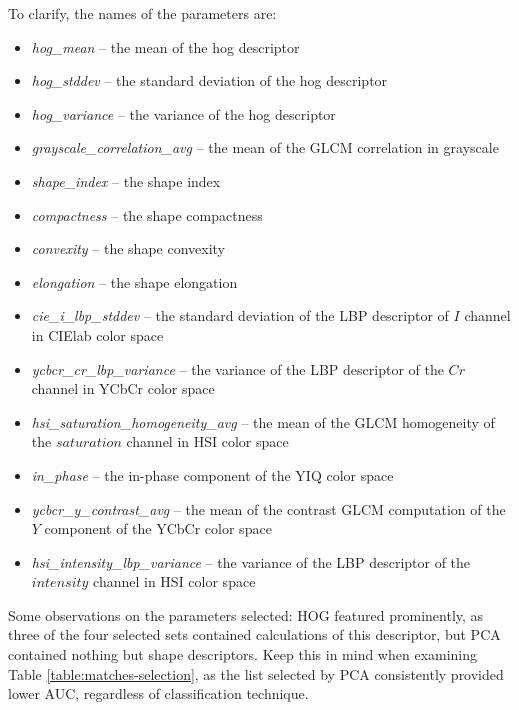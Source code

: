 \documentclass[letterpaper]{report}
\begin{document}
 To clarify, the names of the parameters are:
 \begin{itemize}
 	\item{\textit{hog\_mean} -- the mean of the hog descriptor}
 	\item{\textit{hog\_stddev} -- the standard deviation of the hog descriptor}
 	\item{\textit{hog\_variance} -- the variance of the hog descriptor}
 	\item{\textit{grayscale\_correlation\_avg} -- the mean of the GLCM correlation in grayscale}
 	\item{\textit{shape\_index} -- the shape index}
 	\item{\textit{compactness} -- the shape compactness}
 	\item{\textit{convexity} -- the shape convexity}
 	\item{\textit{elongation} -- the shape elongation}
 	\item{\textit{cie\_i\_lbp\_stddev} -- the standard deviation of the LBP descriptor of $I$ channel in CIElab color space}
 	\item{\textit{ycbcr\_cr\_lbp\_variance} -- the variance of the LBP descriptor of the $Cr$ channel in YCbCr color space}
 	\item{\textit{hsi\_saturation\_homogeneity\_avg} -- the mean of the GLCM homogeneity of the $saturation$ channel in HSI color space}
 	\item{\textit{in\_phase} -- the in-phase component of the YIQ color space}
 	\item{\textit{ycbcr\_y\_contrast\_avg} -- the mean of the contrast GLCM computation of the $Y$ component of the YCbCr color space}
 	\item{\textit{hsi\_intensity\_lbp\_variance} -- the variance of the LBP descriptor of the $intensity$ channel in HSI color space}
 \end{itemize}
 
 Some observations on the parameters selected: HOG featured prominently, as three of the four selected sets contained calculations of this descriptor, but PCA contained nothing but shape descriptors. Keep this in mind when examining Table \ref{table:matches-selection}, as the list selected by PCA consistently provided lower AUC, regardless of classification technique.
 	
\end{document}
